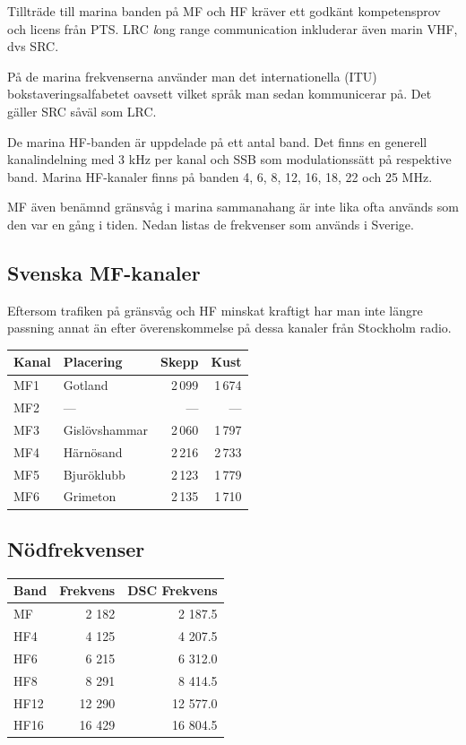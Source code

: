 {Tillträde till marina banden på MF och HF kräver ett godkänt kompetensprov och
licens från PTS. LRC {\textit long range communication} inkluderar även marin
VHF, dvs SRC.

På de marina frekvenserna använder man det internationella (ITU)
bokstaveringsalfabetet oavsett vilket språk man sedan kommunicerar på. Det
gäller SRC såväl som LRC.

De marina HF-banden är uppdelade på ett antal band. Det finns en
generell kanalindelning med 3 kHz per kanal och SSB som
modulationssätt på respektive band. Marina HF-kanaler finns på banden
4, 6, 8, 12, 16, 18, 22 och 25 MHz.

MF även benämnd gränsvåg i marina sammanahang är inte lika ofta
används som den var en gång i tiden. Nedan listas de frekvenser som
används i Sverige.

\subsection{Svenska MF-kanaler}

Eftersom trafiken på gränsvåg och HF minskat kraftigt har man inte längre
passning annat än efter överenskommelse på dessa kanaler från Stockholm radio.

\begin{longtable}{llrr}
\textbf{Kanal} & \textbf{Placering} & \textbf{Skepp} & \textbf{Kust}  \\ \hline
\endhead

MF1 & Gotland       & 2\,099 & 1\,674 \\
MF2 & ---           & ---  & ---   \\
MF3 & Gislövshammar & 2\,060 & 1\,797  \\
MF4 & Härnösand     & 2\,216 & 2\,733  \\
MF5 & Bjuröklubb    & 2\,123 & 1\,779  \\
MF6 & Grimeton      & 2\,135 & 1\,710
\end{longtable}

\subsection{Nödfrekvenser}

\begin{longtable}{lrr}
\textbf{Band} & \textbf{Frekvens} & \textbf{DSC Frekvens}\\ \hline \endhead

MF   & 2 182  & 2 187.5  \\
HF4  & 4 125  & 4 207.5  \\
HF6  & 6 215  & 6 312.0  \\
HF8  & 8 291  & 8 414.5  \\
HF12 & 12 290 & 12 577.0 \\
HF16 & 16 429 & 16 804.5 \\
\end{longtable}

}
